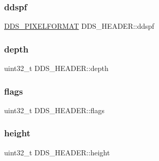 \hypertarget{struct_d_d_s___h_e_a_d_e_r_a27445ea81444c05a620469f266bff154}{}\label{struct_d_d_s___h_e_a_d_e_r_a27445ea81444c05a620469f266bff154} 
\subsubsection{\texorpdfstring{ddspf}{ddspf}}
{\footnotesize\ttfamily \hyperlink{struct_d_d_s___p_i_x_e_l_f_o_r_m_a_t}{D\+D\+S\+\_\+\+P\+I\+X\+E\+L\+F\+O\+R\+M\+AT} D\+D\+S\+\_\+\+H\+E\+A\+D\+E\+R\+::ddspf}

\hypertarget{struct_d_d_s___h_e_a_d_e_r_aa5b6801b932296cdfdc1651310c00c9b}{}\label{struct_d_d_s___h_e_a_d_e_r_aa5b6801b932296cdfdc1651310c00c9b} 
\subsubsection{\texorpdfstring{depth}{depth}}
{\footnotesize\ttfamily uint32\+\_\+t D\+D\+S\+\_\+\+H\+E\+A\+D\+E\+R\+::depth}

\hypertarget{struct_d_d_s___h_e_a_d_e_r_a418e512458f8f02ac5102993095a2aa3}{}\label{struct_d_d_s___h_e_a_d_e_r_a418e512458f8f02ac5102993095a2aa3} 
\subsubsection{\texorpdfstring{flags}{flags}}
{\footnotesize\ttfamily uint32\+\_\+t D\+D\+S\+\_\+\+H\+E\+A\+D\+E\+R\+::flags}

\hypertarget{struct_d_d_s___h_e_a_d_e_r_a550dc15efb086708b8eac1bfebd2e617}{}\label{struct_d_d_s___h_e_a_d_e_r_a550dc15efb086708b8eac1bfebd2e617} 
\subsubsection{\texorpdfstring{height}{height}}
{\footnotesize\ttfamily uint32\+\_\+t D\+D\+S\+\_\+\+H\+E\+A\+D\+E\+R\+::height}

